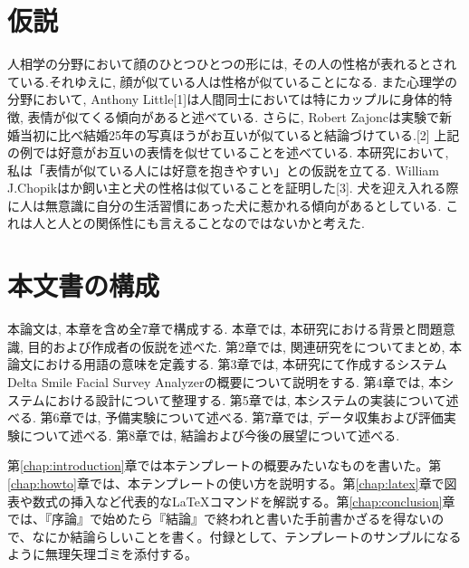 
\section{仮説}
人相学の分野において顔のひとつひとつの形には, その人の性格が表れるとされている.それゆえに, 顔が似ている人は性格が似ていることになる.
また心理学の分野において, Anthony Little[1]は人間同士においては特にカップルに身体的特徴, 表情が似てくる傾向があると述べている.
さらに, Robert Zajoncは実験で新婚当初に比べ結婚25年の写真ほうがお互いが似ていると結論づけている.[2]
上記の例では好意がお互いの表情を似せていることを述べている.
本研究において, 私は「表情が似ている人には好意を抱きやすい」との仮説を立てる.
William J.Chopikはか飼い主と犬の性格は似ていることを証明した[3]. 犬を迎え入れる際に人は無意識に自分の生活習慣にあった犬に惹かれる傾向があるとしている.
これは人と人との関係性にも言えることなのではないかと考えた.



\section{本文書の構成}

本論文は, 本章を含め全7章で構成する. 本章では, 本研究における背景と問題意識, 目的および作成者の仮説を述べた.
第2章では, 関連研究をについてまとめ, 本論文における用語の意味を定義する.
第3章では, 本研究にて作成するシステムDelta Smile Facial Survey Analyzerの概要について説明をする.
第4章では, 本システムにおける設計について整理する.
第5章では, 本システムの実装について述べる.
第6章では, 予備実験について述べる.
第7章では, データ収集および評価実験について述べる.
第8章では, 結論および今後の展望について述べる.

第\ref{chap:introduction}章では本テンプレートの概要みたいなものを書いた。第\ref{chap:howto}章では、本テンプレートの使い方を説明する。第\ref{chap:latex}章で図表や数式の挿入など代表的な\LaTeX コマンドを解説する。第\ref{chap:conclusion}章では、『序論』で始めたら『結論』で終われと書いた手前書かざるを得ないので、なにか結論らしいことを書く。付録として、テンプレートのサンプルになるように無理矢理ゴミを添付する。
